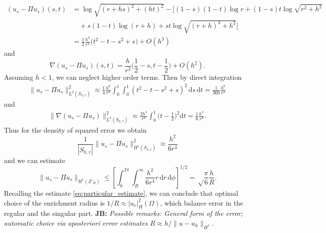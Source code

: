 \documentclass[preprint,12pt]{elsarticle}
\def\abs#1{\left|#1\right|}
\def\d{\mathrm{d}}
\def\norm#1{\| #1 \|}
\def\abs#1{| #1 |}
\newcommand{\noteJB}[1]{{\color{Blue} \textbf{JB: } \textit{#1}}}
\begin{document}
\begin{align*}
 (u_s - \Pi u_s)(s,t)&=\log\sqrt{(r+hs)^2+(ht)^2} -\Big[(1-s)(1-t)\log r + (1-s)t\log\sqrt{r^2+h^2}\\
 &\quad+ s(1-t) \log(r+h) + st\log\sqrt{(r+h)^2+h^2} \Big]\\
 &=\frac12 \frac{h^2}{r^2}\big(t^2-t - s^2 +s\big) + O(h^3)
\end{align*}
and 
\begin{equation}
 \nabla(u_s - \Pi u_s)(s,t) = \frac{h}{r^2} \Big( \frac12-s, t-\frac12 \Big) + O(h^2).
\end{equation}
Assuming $h<1$, we can neglect higher order terms. Then by direct integration
\begin{align*}
 \norm{u_s - \Pi u_s}^2_{L^2(S_{h,r})} \approx \frac14 \frac{h^6}{r^4}\int_0^1\int_0^1 (t^2-t-s^2+s)^2\,\d s\, \d t = \frac{1}{360}\frac{h^6}{r^4} 
\end{align*}
and
\begin{align*}
 \norm{\nabla(u_s - \Pi u_s)}^2_{L^2(S_{h,r})} \approx \frac{2h^4}{r^4} \int_0^1 \Big(t-\frac12\Big)^2 \d t = \frac{1}{6}\frac{h^4}{r^4}.
\end{align*}
Thus for the density of squared error we obtain 
\[
    \frac{1}{\abs{S_{h,r}}} \norm{u_s - \Pi u_s}^2_{H^1(S_{h,r})} \approx \frac{h^2}{6r^4}
\]
and we can estimate
\[
  \norm{u_s - \Pi u_s}_{H^1(Z'_R)} \le \left[\int_0^{2\pi} \int_R^\infty \frac{h^2} {6r^4} r \,\d r\, \d \phi\right]^{1/2} = \sqrt\frac{\pi}{6}\frac{h}{R}.
\]
Recalling the estimate \eqref{eq:particular_estimate}, we can conclude that optimal choice of the enrichment radius is $1/R\approx \abs{u_r}_H^2(\Omega)$, 
which balance error in the regular and the singular part. \noteJB{Possible remarks: General form of the error; automatic choice via aposteriori error estimates
$R \approx h/\norm{u-u_h}_{H^1}$.}
\end{document}
